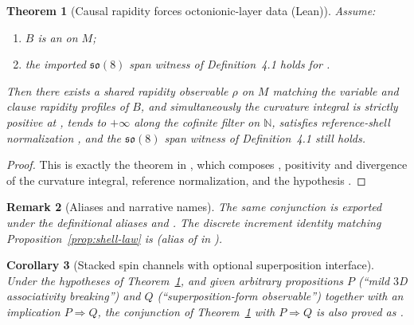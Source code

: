 \documentclass[11pt]{amsart}
\newtheorem{theorem}{Theorem}[section]
\newtheorem{corollary}[theorem]{Corollary}
\newtheorem{remark}[theorem]{Remark}
\begin{document}
\begin{theorem}[Causal rapidity forces octonionic-layer data (Lean)]
\label{thm:lean-forcing}
Assume:
\begin{enumerate}
  \item \(B\) is an  on \(M\);
  \item the imported \(\mathfrak{so}(8)\) span witness of Definition~4.1 holds for .
\end{enumerate}
Then there exists a shared rapidity observable \(\rho\) on \(M\) matching the variable and clause rapidity profiles of \(B\), and simultaneously the curvature integral is strictly positive at , tends to \(+\infty\) along the cofinite filter on \(\mathbb{N}\), satisfies reference-shell normalization , and the \(\mathfrak{so}(8)\) span witness of Definition~4.1 still holds.
\end{theorem}

\begin{proof}
This is exactly the theorem  in , which composes , positivity and divergence of the curvature integral, reference normalization, and the hypothesis .
\end{proof}

\begin{remark}[Aliases and narrative names]
The same conjunction is exported under the definitional aliases  and . The discrete increment identity matching Proposition~\ref{prop:shell-law} is  (alias of  in ).
\end{remark}

\begin{corollary}[Stacked spin channels with optional superposition interface]
Under the hypotheses of Theorem~\ref{thm:lean-forcing}, and given arbitrary propositions \(P\) (``mild \(3\)D associativity breaking'') and \(Q\) (``superposition-form observable'') together with an implication \(P\Rightarrow Q\), the conjunction of Theorem~\ref{thm:lean-forcing} with \(P\Rightarrow Q\) is also proved as .
\end{corollary}
\end{document}
